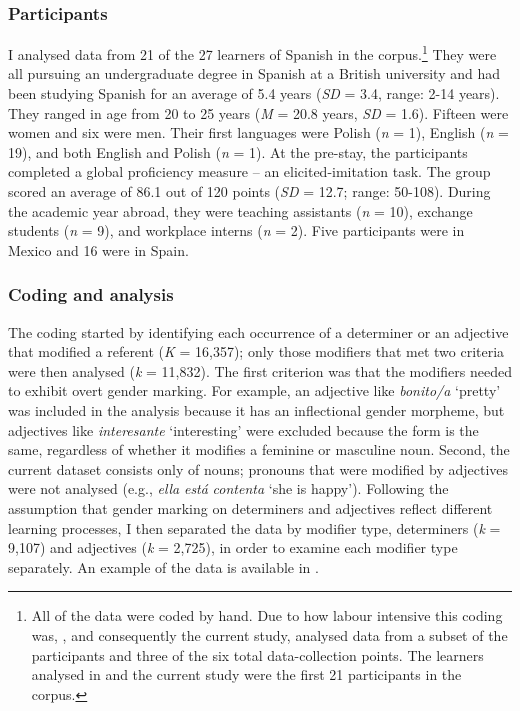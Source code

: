 \documentclass[output=paper,colorlinks,citecolor=brown,modfonts,nonflat]{../langscibook}
\begin{document}
\subsubsection{Participants}\label{sec:gudmestad:3.1.2}

I analysed data from 21 of the 27 learners of Spanish in the corpus.\footnote{{All of the data were coded by hand. Due to how labour intensive this coding was, \citet{GudmestadEtAl2019}, and consequently the current study, analysed data from a subset of the participants and three of the six total data-collection points. The learners analysed in \citeauthor{GudmestadEtAl2019} and the current study were the first 21 participants in the corpus.}} They were all pursuing an undergraduate degree in Spanish at a British university and had been studying Spanish for an average of 5.4 years (\textit{SD} = 3.4, range: 2-14 years). They ranged in age from 20 to 25 years (\textit{M} = 20.8 years, \textit{SD} = 1.6). Fifteen were women and six were men. Their first languages were Polish (\textit{n} = 1), English (\textit{n} = 19), and both English and Polish (\textit{n} = 1). At the pre-stay, the participants completed a global proficiency measure – an elicited-imitation task. The group scored an average of 86.1 out of 120 points (\textit{SD} = 12.7; range: 50-108). During the academic year abroad, they were teaching assistants (\textit{n} = 10), exchange students (\textit{n} = 9), and workplace interns (\textit{n} = 2). Five participants were in Mexico and 16 were in Spain.


\subsubsection{Coding and analysis}\label{sec:gudmestad:3.1.3}

The coding started by identifying each occurrence of a determiner or an adjective that modified a referent (\textit{K} = 16,357); only those modifiers that met two criteria were then analysed (\textit{k} = 11,832). The first criterion was that the modifiers needed to exhibit overt gender marking. For example, an adjective like \textit{bonito/a} ‘pretty’ was included in the analysis because it has an inflectional gender morpheme, but adjectives like \textit{interesante} ‘interesting’ were excluded because the form is the same, regardless of whether it modifies a feminine or masculine noun. Second, the current dataset consists only of nouns; pronouns that were modified by adjectives were not analysed (e.g., \textit{ella} \textit{está} \textit{contenta} ‘she is happy’). Following the assumption that gender marking on determiners and adjectives reflect different learning processes, I then separated the data by modifier type, determiners (\textit{k} = 9,107) and adjectives (\textit{k} = 2,725), in order to examine each modifier type separately. An example of the data is available in .
\end{document}
